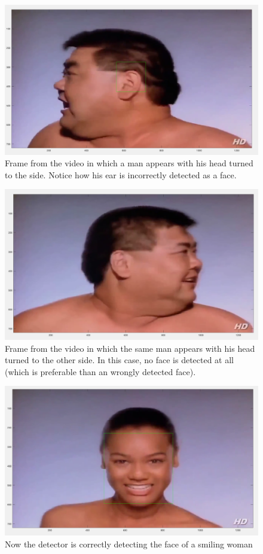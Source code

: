 \begin{figure}[h!tb]
	\centering
		\includegraphics[width=0.6 \textwidth]{./img/ex2/screenshot0.png}
	\caption[Frame from the video in which a man appears with his head turned to the side]{ Frame from the video in which a man appears with his head turned to the side. Notice how his ear is incorrectly detected as a face. }
	\label{fig:video0}
\end{figure}

\begin{figure}[h!tb]
	\centering
		\includegraphics[width=0.6 \textwidth]{./img/ex2/screenshot1.png}
	\caption[The man's head is turned to the other side]{ Frame from the video in which the same man appears with his head turned to the other side. In this case, no face is detected at all (which is preferable than an wrongly detected face). }
	\label{fig:video1}
\end{figure}

\begin{figure}[h!tb]
	\centering
		\includegraphics[width=0.6 \textwidth]{./img/ex2/screenshot6.png}
	\caption[Now the detector deals with the face of a woman instead of a man]{ Now the detector is correctly detecting the face of a smiling woman }
	\label{fig:video6}
\end{figure}
